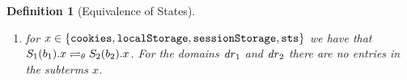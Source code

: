 \documentclass[letterpaper,onecolumn,10pt]{article}
\newtheorem{definition}{Definition}
\begin{document}
\begin{definition}[Equivalence of States]
\begin{enumerate}
\begin{enumerate}
\begin{enumerate}
\begin{enumerate}
        \item
          $S_1(b_1).j.\str{scriptinputs} \prototagequiv{\theta}
          S_2(b_2).j.\str{scriptinputs}$, and
        \item\label{eqs:b:w:att_script:t}
          $\forall t \in T$: $t$ is not contained in any subterm of 
          $S_1(b_1).j.\str{scriptstate}$ except for 
          $S_1(b_1).j.\str{scriptstate}.\mi{parameters}[\str{t}]$, and
        \item $\nexists\, l \in L$ such that $l$ is a subterm of
          $S_1(b_1).j.\str{scriptstate}$ or of
          $S_1(b_1).j.\str{scriptinputs}$, and
        \end{enumerate}
      \end{enumerate}
    \item\label{eqs:b:misc} for
      $x \in \{\mathtt{cookies},\mathtt{localStorage},\mathtt{sessionStorage},\mathtt{sts}\}$
      we have that $S_1(b_1).x \rightleftharpoons_{\theta} S_2(b_2).x$. For the
      domains $\mathit{dr}_1$ and $\mathit{dr}_2$ there are no entries in the
      subterms $x$.
    \end{enumerate}
  \end{enumerate}
\end{definition}
\end{document}
